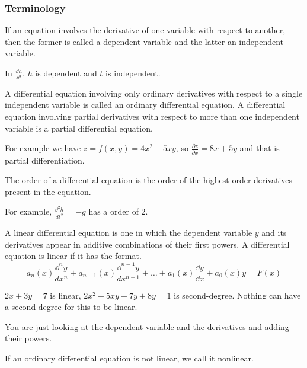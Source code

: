 \documentclass[../diffeq.tex]{subfiles}
\begin{document}
\subsubsection*{Terminology}
If an equation involves the derivative of one variable with respect to another, then the former is called a dependent variable and the latter an independent variable.

In $\frac{\dd h}{\dd t}$, $h$ is dependent and $t$ is independent.

A differential equation involving only ordinary derivatives with respect to a single independent variable is called an ordinary differential equation. A differential equation involving partial derivatives 
with respect to more than one independent variable is a partial differential equation.

For example we have $z=f(x,y)=4x^2+5xy$, so $\frac{\partial z}{\partial x} = 8x+5y$ and that is partial differentiation.

The order of a differential equation is the order of the highest-order derivatives present in the equation.

For example, $\frac{\dd^2 h}{dt^2}=-g$ has a order of 2.

A linear differential equation is one in which the dependent variable $y$ and its derivatives appear in additive combinations of their first powers. A differential equation is linear if it has the format.
\[ a_n(x)\frac{\dd^n y}{dx^n}+a_{n-1}(x)\frac{\dd^{n-1}y}{dx^{n-1}}+\dots + a_1(x)\frac{\dd y}{\dd x}+a_0(x)y=F(x)\]

$2x+3y=7$ is linear, $2x^2+5xy+7y+8y = 1$ is second-degree. Nothing can have a second degree for this to be linear.

You are just looking at the dependent variable and the derivatives and adding their powers.

If an ordinary differential equation is not linear, we call it nonlinear.
\end{document}
